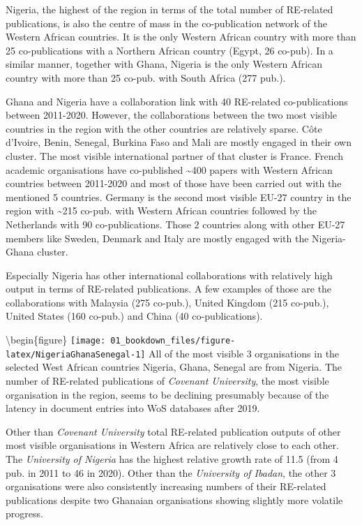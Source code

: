 \documentclass[12pt,twoside]{report}
\begin{document}
Nigeria, the highest of the region in terms of the total number of RE-related publications, is also the centre of mass in the co-publication network of the Western African countries. It is the only Western African country with more than 25 co-publications with a Northern African country (Egypt, 26 co-pub). In a similar manner, together with Ghana, Nigeria is the only Western African country with more than 25 co-pub. with South Africa (277 pub.).

Ghana and Nigeria have a collaboration link with 40 RE-related co-publications between 2011-2020. However, the collaborations between the two most visible countries in the region with the other countries are relatively sparse. Côte d'Ivoire, Benin, Senegal, Burkina Faso and Mali are mostly engaged in their own cluster. The most visible international partner of that cluster is France. French academic organisations have co-published \textasciitilde400 papers with Western African countries between 2011-2020 and most of those have been carried out with the mentioned 5 countries. Germany is the second most visible EU-27 country in the region with \textasciitilde215 co-pub. with Western African countries followed by the Netherlands with 90 co-publications. Those 2 countries along with other EU-27 members like Sweden, Denmark and Italy are mostly engaged with the Nigeria-Ghana cluster.

Especially Nigeria has other international collaborations with relatively high output in terms of RE-related publications. A few examples of those are the collaborations with Malaysia (275 co-pub.), United Kingdom (215 co-pub.), United States (160 co-pub.) and China (40 co-publications).

\textbackslash begin\{figure\}
\texttt{[image: 01\_bookdown\_files/figure-latex/NigeriaGhanaSenegal-1]}
All of the most visible 3 organisations in the selected West African countries Nigeria, Ghana, Senegal are from Nigeria. The number of RE-related publications of \emph{Covenant University}, the most visible organisation in the region, seems to be declining presumably because of the latency in document entries into WoS databases after 2019.

Other than \emph{Covenant University} total RE-related publication outputs of other most visible organisations in Western Africa are relatively close to each other. The \emph{University of Nigeria} has the highest relative growth rate of 11.5 (from 4 pub. in 2011 to 46 in 2020). Other than the \emph{University of Ibadan}, the other 3 organisations were also consistently increasing numbers of their RE-related publications despite two Ghanaian organisations showing slightly more volatile progress.
\end{document}

